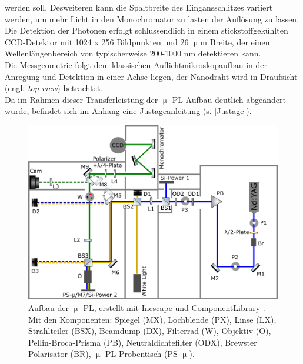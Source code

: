 werden soll. Desweiteren kann die Spaltbreite des Eingansschlitzes variiert werden, um mehr Licht in den Monochromator zu lasten der Auflösung zu lassen. Die Detektion der Photonen erfolgt schlussendlich in einem stickstoffgekühlten CCD-Detektor mit 1024 x 256 Bildpunkten und 26 $\upmu$m Breite, der einen Wellenlängenbereich von typischerweise 200-1000 nm detektieren kann.\\
Die Messgeometrie folgt dem klassischen Auflichtmikroskopaufbau in der Anregung und Detektion in einer Achse liegen, der Nanodraht wird in Draufsicht (engl. \textit{top view}) betrachtet. \\
Da im Rahmen dieser Transferleistung der $\upmu$-PL Aufbau deutlich abgeändert wurde, befindet sich im Anhang eine Justageanleitung (s. \autoref{Justage}).
\begin{figure}[h]
\centering
\includegraphics[width=1\textwidth]{Bilder/methodik/opt_aufb}
\caption[Aufbau $\upmu$-PL]{Aufbau der $\upmu$-PL, erstellt mit Incscape und ComponentLibrary \cite{lib}. Mit den Komponenten: Spiegel (MX), Lochblende (PX), Linse (LX), Strahlteiler (BSX), Beamdump (DX), Filterrad (W), Objektiv (O), Pellin-Broca-Prisma (PB), Neutraldichtefilter (ODX), Brewster Polarisator (BR), $\upmu$-PL Probentisch (PS-$\upmu$).}
\label{AufbauPL}
\end{figure}
